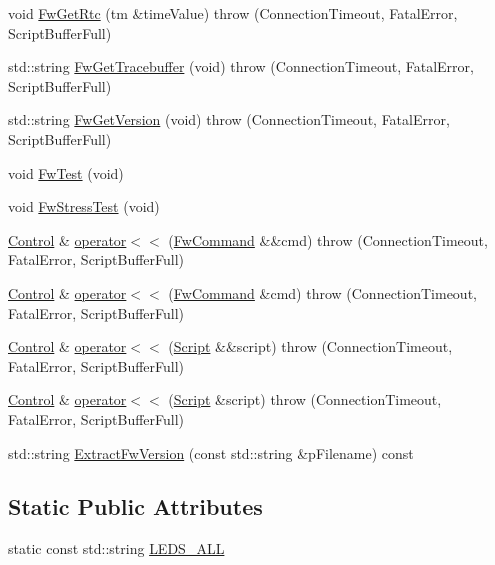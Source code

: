 \begin{DoxyCompactItemize}
\item 
void \hyperlink{class_wy_light_1_1_control_a9a082452281e1de4160b1fa9f1275a91}{Fw\-Get\-Rtc} (tm \&time\-Value)  throw (\-Connection\-Timeout, Fatal\-Error, Script\-Buffer\-Full)
\item 
std\-::string \hyperlink{class_wy_light_1_1_control_af2035569a368fbcafa758ec649914f66}{Fw\-Get\-Tracebuffer} (void)  throw (\-Connection\-Timeout, Fatal\-Error, Script\-Buffer\-Full)
\item 
std\-::string \hyperlink{class_wy_light_1_1_control_adb78c0d47ab18019b4e5758df6796062}{Fw\-Get\-Version} (void)  throw (\-Connection\-Timeout, Fatal\-Error, Script\-Buffer\-Full)
\item 
void \hyperlink{class_wy_light_1_1_control_a4a4621f063e3d539f06d4e1141229e44}{Fw\-Test} (void)
\item 
void \hyperlink{class_wy_light_1_1_control_af2f20a5d9d87b9b1c8a2e481e71602a8}{Fw\-Stress\-Test} (void)
\item 
\hyperlink{class_wy_light_1_1_control}{Control} \& \hyperlink{class_wy_light_1_1_control_a3679510a5c28c97ef9cbbbbc2ffee9e8}{operator$<$$<$} (\hyperlink{class_wy_light_1_1_fw_command}{Fw\-Command} \&\&cmd)  throw (\-Connection\-Timeout, Fatal\-Error, Script\-Buffer\-Full)
\item 
\hyperlink{class_wy_light_1_1_control}{Control} \& \hyperlink{class_wy_light_1_1_control_ab0948069a02431beb689055b56afc759}{operator$<$$<$} (\hyperlink{class_wy_light_1_1_fw_command}{Fw\-Command} \&cmd)  throw (\-Connection\-Timeout, Fatal\-Error, Script\-Buffer\-Full)
\item 
\hyperlink{class_wy_light_1_1_control}{Control} \& \hyperlink{class_wy_light_1_1_control_add8b6887c1fb93571af763d436193f7e}{operator$<$$<$} (\hyperlink{class_wy_light_1_1_script}{Script} \&\&script)  throw (\-Connection\-Timeout, Fatal\-Error, Script\-Buffer\-Full)
\item 
\hyperlink{class_wy_light_1_1_control}{Control} \& \hyperlink{class_wy_light_1_1_control_abd06c7b743976e2c0f345e22fd2f5a2a}{operator$<$$<$} (\hyperlink{class_wy_light_1_1_script}{Script} \&script)  throw (\-Connection\-Timeout, Fatal\-Error, Script\-Buffer\-Full)
\item 
std\-::string \hyperlink{class_wy_light_1_1_control_a09d8a865f5557d584032cf088e32ade0}{Extract\-Fw\-Version} (const std\-::string \&p\-Filename) const 
\end{DoxyCompactItemize}
\subsection*{Static Public Attributes}
\begin{DoxyCompactItemize}
\item 
static const std\-::string \hyperlink{class_wy_light_1_1_control_a6d407aadfe5921e4af9bf756cc9d8a28}{L\-E\-D\-S\-\_\-\-A\-L\-L}
\end{DoxyCompactItemize}
